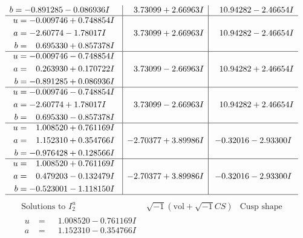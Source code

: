 \documentclass[1p]{elsarticle_modified}
\theoremstyle{definition}
\newcommand{\I}{\sqrt{-1}}
\begin{document}
$$\begin{array}{c|c|c}
\begin{aligned}
b &= -0.891285 - 0.086936 I\end{aligned}
 & \phantom{-}3.73099 + 2.66963 I & \phantom{-}10.94282 - 2.46654 I \\ \hline\begin{aligned}
u &= -0.009746 + 0.748854 I \\
a &= -2.60774 - 1.78017 I \\
b &= \phantom{-}0.695330 + 0.857378 I\end{aligned}
 & \phantom{-}3.73099 + 2.66963 I & \phantom{-}10.94282 - 2.46654 I \\ \hline\begin{aligned}
u &= -0.009746 - 0.748854 I \\
a &= \phantom{-}0.263930 + 0.170722 I \\
b &= -0.891285 + 0.086936 I\end{aligned}
 & \phantom{-}3.73099 - 2.66963 I & \phantom{-}10.94282 + 2.46654 I \\ \hline\begin{aligned}
u &= -0.009746 - 0.748854 I \\
a &= -2.60774 + 1.78017 I \\
b &= \phantom{-}0.695330 - 0.857378 I\end{aligned}
 & \phantom{-}3.73099 - 2.66963 I & \phantom{-}10.94282 + 2.46654 I \\ \hline\begin{aligned}
u &= \phantom{-}1.008520 + 0.761169 I \\
a &= \phantom{-}1.152310 + 0.354766 I \\
b &= -0.976428 + 0.128566 I\end{aligned}
 & -2.70377 + 3.89986 I & -0.32016 - 2.93300 I \\ \hline\begin{aligned}
u &= \phantom{-}1.008520 + 0.761169 I \\
a &= \phantom{-}0.479203 - 0.132479 I \\
b &= -0.523001 - 1.118150 I\end{aligned}
 & -2.70377 + 3.89986 I & -0.32016 - 2.93300 I\\
 \hline 
 \end{array}$$\newpage$$\begin{array}{c|c|c}  
\text{Solutions to }I^u_{2}& \I (\text{vol} + \sqrt{-1}CS) & \text{Cusp shape}\\
 \hline 
\begin{aligned}
u &= \phantom{-}1.008520 - 0.761169 I \\
a &= \phantom{-}1.152310 - 0.354766 I \\

\end{aligned}
\end{array}$$
\end{document}
